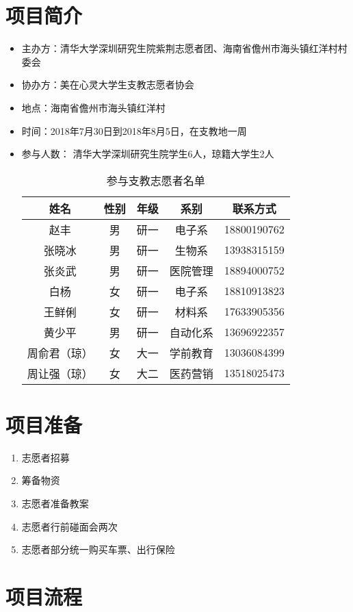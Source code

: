 \documentclass[12pt]{ctexart}
\begin{document}
\section{项目简介}
\begin{itemize}
\item 主办方：清华大学深圳研究生院紫荆志愿者团、海南省儋州市海头镇红洋村村委会
\item 协办方：美在心灵大学生支教志愿者协会
\item 地点：海南省儋州市海头镇红洋村
\item 时间：2018年7月30日到2018年8月5日，在支教地一周
\item 参与人数： 清华大学深圳研究生院学生6人，琼籍大学生2人
\begin{table}[!ht]
\centering
\begin{tabular}{|c|c|c|c|c|}
\hline
姓名 & 性别 & 年级 & 系别 & 联系方式\\
\hline
赵丰 & 男 & 研一 & 电子系 & 18800190762 \\
\hline
张晓冰  &	男	& 研一 &  生物系 & 13938315159 \\
\hline
张炎武 & 男 & 研一 & 医院管理 & 18894000752\\
\hline
白杨 & 女 & 研一 & 电子系 & 18810913823\\
\hline
王鲜俐 & 女 & 研一 & 材料系 & 17633905356\\
\hline
黄少平 & 男 & 研一 & 自动化系 & 13696922357\\
\hline
周俞君（琼） & 女 & 大一 & 学前教育 & 13036084399 \\
\hline
周让强（琼） & 女 & 大二 & 医药营销 & 13518025473 \\
\hline
\end{tabular}
\caption{参与支教志愿者名单}
\end{table}
\end{itemize}
\section{项目准备}
\begin{enumerate}
\item 志愿者招募
\item 筹备物资
\item 志愿者准备教案
\item 志愿者行前碰面会两次
\item 志愿者部分统一购买车票、出行保险
\end{enumerate}
\section{项目流程}
\end{document}
